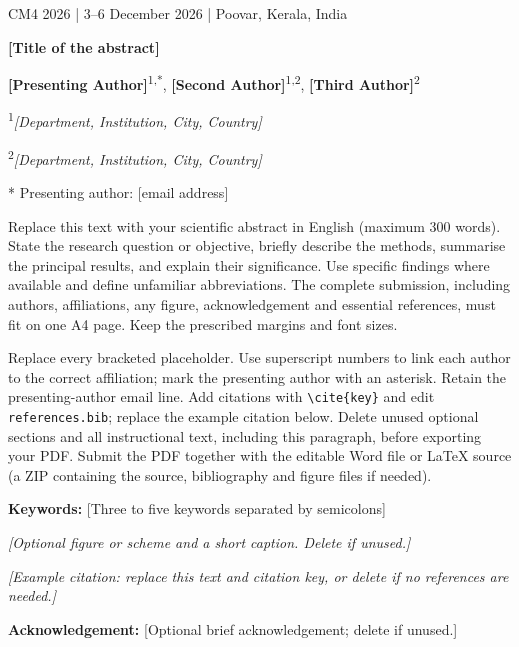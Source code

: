 \documentclass[11pt,a4paper]{article}
\begin{document}
\begin{center}
{\fontsize{9}{11}\selectfont CM4 2026 | 3--6 December 2026 | Poovar, Kerala, India}\par
{\fontsize{14}{16}\selectfont\bfseries [Title of the abstract]}\par
\textbf{[Presenting Author]}\textsuperscript{1,*},
\textbf{[Second Author]}\textsuperscript{1,2},
\textbf{[Third Author]}\textsuperscript{2}\par
{\fontsize{10}{12}\selectfont
\textsuperscript{1}\textit{[Department, Institution, City, Country]}\par
\textsuperscript{2}\textit{[Department, Institution, City, Country]}\par
* Presenting author: [email address]\par}
\end{center}
Replace this text with your scientific abstract in English (maximum 300 words). State the research question or objective, briefly describe the methods, summarise the principal results, and explain their significance. Use specific findings where available and define unfamiliar abbreviations. The complete submission, including authors, affiliations, any figure, acknowledgement and essential references, must fit on one A4 page. Keep the prescribed margins and font sizes.

Replace every bracketed placeholder. Use superscript numbers to link each author to the correct affiliation; mark the presenting author with an asterisk. Retain the presenting-author email line. Add citations with \verb|\cite{key}| and edit \texttt{references.bib}; replace the example citation below. Delete unused optional sections and all instructional text, including this paragraph, before exporting your PDF. Submit the PDF together with the editable Word file or LaTeX source (a ZIP containing the source, bibliography and figure files if needed).

{\fontsize{10}{12}\selectfont
\textbf{Keywords:} [Three to five keywords separated by semicolons]\par
\textit{[Optional figure or scheme and a short caption. Delete if unused.]}\par
\textit{[Example citation: replace this text and citation key, or delete if no references are needed.]}\cite{example}\par
\textbf{Acknowledgement:} [Optional brief acknowledgement; delete if unused.]\par


}
\end{document}
